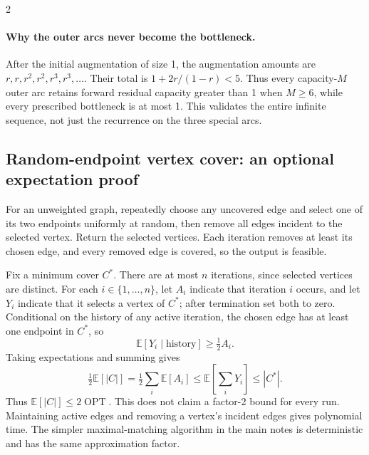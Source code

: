 \documentclass[8pt]{extarticle}
\theoremstyle{definition}
\newcommand{\OPT}{\operatorname{OPT}}
\begin{document}
\begin{multicols*}{2}
\paragraph{Why the outer arcs never become the bottleneck.}
After the initial augmentation of size 1, the augmentation amounts are
$r,r,r^2,r^2,r^3,r^3,\ldots$. Their total is
$1+2r/(1-r)<5$. Thus every capacity-$M$ outer arc retains forward residual capacity
greater than 1 when $M\ge6$, while every prescribed bottleneck is at most 1.
This validates the entire infinite sequence, not just the recurrence on the three special arcs.


\subsection{Random-endpoint vertex cover: an optional expectation proof}
\label{app:randomvc}
For an unweighted graph, repeatedly choose any uncovered edge and select one of its two
endpoints uniformly at random, then remove all edges incident to the selected vertex.
Return the selected vertices. Each iteration removes at least its chosen edge, and every
removed edge is covered, so the output is feasible.

Fix a minimum cover $C^*$. There are at most $n$ iterations, since selected vertices are
distinct. For each $i\in\{1,\ldots,n\}$, let $A_i$ indicate that iteration $i$ occurs,
and let $Y_i$ indicate that it selects a vertex of $C^*$; after termination set both to zero.
Conditional on the history of any active iteration, the chosen edge has at least one
endpoint in $C^*$, so
\[
\mathbb E[Y_i\mid\text{history}]\ge\tfrac12 A_i.
\]
Taking expectations and summing gives
\[
\tfrac12\mathbb E[|C|]=\tfrac12\sum_i\mathbb E[A_i]
\le\mathbb E\!\left[\sum_iY_i\right]\le |C^*|.
\]
Thus $\mathbb E[|C|]\le2\OPT$. This does not claim a factor-2 bound for every run.
Maintaining active edges and removing a vertex's incident edges gives polynomial time.
The simpler maximal-matching algorithm in the main notes is deterministic and has the
same approximation factor.

\end{multicols*}
\end{document}
